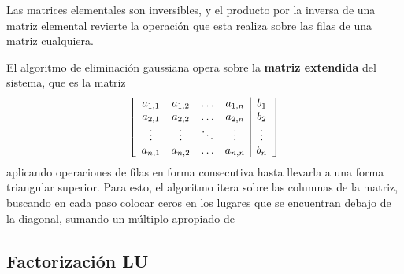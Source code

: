 Las matrices elementales son inversibles, y el producto por la inversa de una
matriz elemental revierte la operación que esta realiza sobre las filas de una
matriz cualquiera.

El algoritmo de eliminación gaussiana opera sobre la \textbf{matriz extendida}
del sistema, que es la matriz
\[ \mleft[ \begin{array}{cccc|c}
    a_{1,1} & a_{1,2} & \dots  & a_{1,n} & b_{1} \\
    a_{2,1} & a_{2,2} & \dots  & a_{2,n} & b_{2} \\
    \vdots  & \vdots  & \ddots & \vdots  & \vdots \\
    a_{n,1} & a_{n,2} & \dots  & a_{n,n} & b_{n} \\
\end{array} \mright] \]
aplicando operaciones de filas en forma consecutiva hasta llevarla a una forma
triangular superior. Para esto, el algoritmo itera sobre las columnas de la
matriz, buscando en cada paso colocar ceros en los lugares que se encuentran
debajo de la diagonal, sumando un múltiplo apropiado de 

\subsection{Factorización LU}
